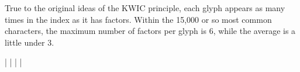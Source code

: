 \endgroup{}

\vspace{\myLineheight}\begin{multicols}{2}\raggedcolumns{}

True to the original ideas of the KWIC principle, each glyph appears
as many times in the index as it has factors. Within the 15,000 or so most
common characters, the maximum number of factors per glyph is 6, while the
average is a little under 3.

\end{multicols}



\begingroup\mktsObeyAllLines{}

\begingroup\mktsStyleCode{}\cjkgGlue{\cjk{}\cjkgGlue{\cnsym{}　}\cjkgGlue{}\cjkgGlue{\cnsym{}　}\cjkgGlue{}\cjkgGlue{\cnsym{}　}\cjkgGlue{}\cjkgGlue{\cnsym{}　}\cjkgGlue{}\cjkgGlue{\cnsym{}　}\cjkgGlue{}\cjkgGlue{\cnsym{}　}\cjkgGlue{}}\cjkgGlue{}|\cjkgGlue{} 
\cjkgGlue{}|\cjkgGlue{} 
\cjkgGlue{}|\cjkgGlue{} 
\cjkgGlue{}|\cjkgGlue{} 
\endgroup{}{}

\endgroup{}\begingroup\mktsObeyAllLines{}

